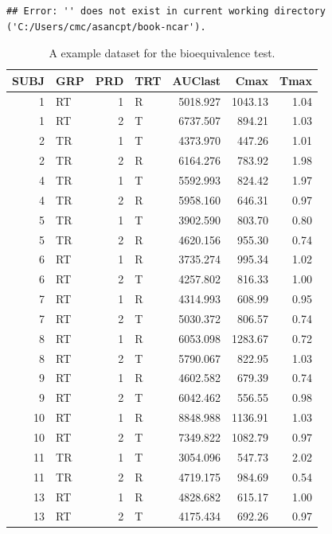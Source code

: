 \documentclass[12pt,]{krantz}
\begin{document}
\begin{verbatim}
## Error: '' does not exist in current working directory ('C:/Users/cmc/asancpt/book-ncar').
\end{verbatim}

\begin{table}

\caption{\label{tab:beconcdata}A example dataset for the bioequivalence test.}
\centering
\begin{tabular}[t]{r|l|r|l|r|r|r}
\hline
SUBJ & GRP & PRD & TRT & AUClast & Cmax & Tmax\\
\hline
1 & RT & 1 & R & 5018.927 & 1043.13 & 1.04\\
\hline
1 & RT & 2 & T & 6737.507 & 894.21 & 1.03\\
\hline
2 & TR & 1 & T & 4373.970 & 447.26 & 1.01\\
\hline
2 & TR & 2 & R & 6164.276 & 783.92 & 1.98\\
\hline
4 & TR & 1 & T & 5592.993 & 824.42 & 1.97\\
\hline
4 & TR & 2 & R & 5958.160 & 646.31 & 0.97\\
\hline
5 & TR & 1 & T & 3902.590 & 803.70 & 0.80\\
\hline
5 & TR & 2 & R & 4620.156 & 955.30 & 0.74\\
\hline
6 & RT & 1 & R & 3735.274 & 995.34 & 1.02\\
\hline
6 & RT & 2 & T & 4257.802 & 816.33 & 1.00\\
\hline
7 & RT & 1 & R & 4314.993 & 608.99 & 0.95\\
\hline
7 & RT & 2 & T & 5030.372 & 806.57 & 0.74\\
\hline
8 & RT & 1 & R & 6053.098 & 1283.67 & 0.72\\
\hline
8 & RT & 2 & T & 5790.067 & 822.95 & 1.03\\
\hline
9 & RT & 1 & R & 4602.582 & 679.39 & 0.74\\
\hline
9 & RT & 2 & T & 6042.462 & 556.55 & 0.98\\
\hline
10 & RT & 1 & R & 8848.988 & 1136.91 & 1.03\\
\hline
10 & RT & 2 & T & 7349.822 & 1082.79 & 0.97\\
\hline
11 & TR & 1 & T & 3054.096 & 547.73 & 2.02\\
\hline
11 & TR & 2 & R & 4719.175 & 984.69 & 0.54\\
\hline
13 & RT & 1 & R & 4828.682 & 615.17 & 1.00\\
\hline
13 & RT & 2 & T & 4175.434 & 692.26 & 0.97\\

\end{tabular}
\end{table}
\end{document}
